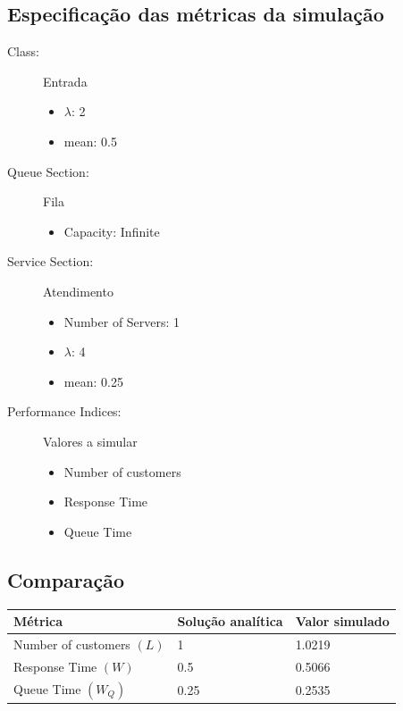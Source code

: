 \documentclass[12pt,a4paper]{article}
\begin{document}
\subsection{Especificação das métricas da simulação}
\begin{description}
	\item[Class:] Entrada 
	\begin{itemize}
		\item $\lambda$: 2
		\item mean: 0.5
	\end{itemize}
	\item[Queue Section:] Fila
	\begin{itemize}
		\item Capacity: Infinite
	\end{itemize}
	\item[Service Section:] Atendimento
	\begin{itemize}
		\item Number of Servers: 1
		\item $\lambda$: 4
		\item mean: 0.25
	\end{itemize}
	\item[Performance Indices:] Valores a simular 
	\begin{itemize}
		\item Number of customers
		\item Response Time
		\item Queue Time
	\end{itemize}
\end{description}

\subsection{Comparação}

\begin{table}[h]
	\centering
	\begin{tabular}{|l|l|l|} 
		\hline
		\textbf{Métrica} & \textbf{Solução analítica} & \textbf{Valor simulado} \\ 
		\hline
		Number of customers \((L)\) & 1 & 1.0219 \\
		\hline
		Response Time \((W)\) & 0.5 & 0.5066 \\
		\hline
		Queue Time \((W_Q)\) & 0.25 & 0.2535 \\
		\hline
	\end{tabular}
\end{table}
\end{document}
